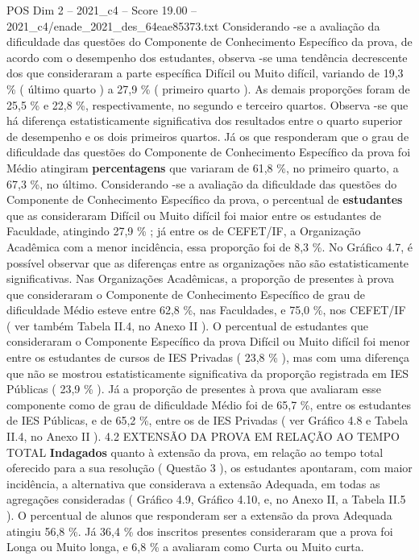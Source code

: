 \begin{textsample}{POS Dim 2 – 2021\_c4 – Score 19.00 – 2021\_c4/enade\_2021\_des\_64eae85373.txt}
Considerando -se a avaliação da dificuldade das questões do Componente de Conhecimento Específico da prova, de acordo com o desempenho dos estudantes, observa -se uma tendência decrescente dos que consideraram a parte específica Difícil ou Muito difícil, variando de 19,3 \% ( último quarto ) a 27,9 \% ( primeiro quarto ).
As demais proporções foram de 25,5 \% e 22,8 \%, respectivamente, no segundo e terceiro quartos.
Observa -se que há diferença estatisticamente significativa dos resultados entre o quarto superior de desempenho e os dois primeiros quartos.
Já os que responderam que o grau de dificuldade das questões do Componente de Conhecimento Específico da prova foi Médio atingiram \textbf{percentagens} que variaram de 61,8 \%, no primeiro quarto, a 67,3 \%, no último.
Considerando -se a avaliação da dificuldade das questões do Componente de Conhecimento Específico da prova, o percentual de \textbf{estudantes} que as consideraram Difícil ou Muito difícil foi maior entre os estudantes de Faculdade, atingindo 27,9 \% ; já entre os de CEFET/IF, a Organização Acadêmica com a menor incidência, essa proporção foi de 8,3 \%.
No Gráfico 4.7, é possível observar que as diferenças entre as organizações não são estatisticamente significativas.
Nas Organizações Acadêmicas, a proporção de presentes à prova que consideraram o Componente de Conhecimento Específico de grau de dificuldade Médio esteve entre 62,8 \%, nas Faculdades, e 75,0 \%, nos CEFET/IF ( ver também Tabela II.4, no Anexo II ).
O percentual de estudantes que consideraram o Componente Específico da prova Difícil ou Muito difícil foi menor entre os estudantes de cursos de IES Privadas ( 23,8 \% ), mas com uma diferença que não se mostrou estatisticamente significativa da proporção registrada em IES Públicas ( 23,9 \% ).
Já a proporção de presentes à prova que avaliaram esse componente como de grau de dificuldade Médio foi de 65,7 \%, entre os estudantes de IES Públicas, e de 65,2 \%, entre os de IES Privadas ( ver Gráfico 4.8 e Tabela II.4, no Anexo II ). 4.2 EXTENSÃO DA PROVA EM RELAÇÃO AO TEMPO TOTAL \textbf{Indagados} quanto à extensão da prova, em relação ao tempo total oferecido para a sua resolução ( Questão 3 ), os estudantes apontaram, com maior incidência, a alternativa que considerava a extensão Adequada, em todas as agregações consideradas ( Gráfico 4.9, Gráfico 4.10, e, no Anexo II, a Tabela II.5 ).
O percentual de alunos que responderam ser a extensão da prova Adequada atingiu 56,8 \%.
Já 36,4 \% dos inscritos presentes consideraram que a prova foi Longa ou Muito longa, e 6,8 \% a avaliaram como Curta ou Muito curta.

\end{textsample}
